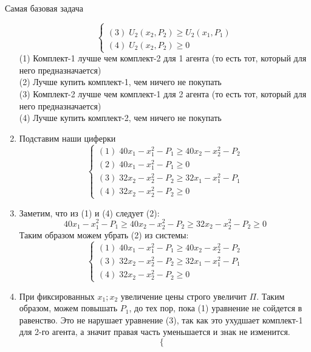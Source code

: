 \begin{mybox}{Самая базовая задача}
\begin{enumerate}
\begin{equation*}
\begin{cases}
           \\
           (3)\;U_2(x_2,P_2)\geq U_2(x_1,P_1)
           \\
           (4)\;U_2(x_2,P_2)\geq 0
         \end{cases}
        \end{equation*}
        (1) Комплект-1 лучше чем комплект-2 для 1 агента (то есть тот, который для него предназначается)\\
        (2) Лучше купить комплект-1, чем ничего не покупать\\
        (3) Комплект-2 лучше чем комплект-1 для 2 агента (то есть тот, который для него предназначается)\\
        (4) Лучше купить комплект-2, чем ничего не покупать
        \item Подставим наши циферки
        \begin{equation*}
         \begin{cases}
           (1)\;40x_1-x_1^2-P_1\geq 40x_2-x_2^2-P_2
           \\
           (2)\;40x_1-x_1^2-P_1\geq 0
           \\
           (3)\;32x_2-x_2^2-P_2\geq 32x_1-x_1^2-P_1
           \\
           (4)\;32x_2-x_2^2-P_2\geq 0
         \end{cases}
        \end{equation*}
        \item Заметим, что из (1) и (4) следует (2):
        $$40x_1-x_1^2-P_1\geq 40x_2-x_2^2-P_2\geq 32x_2-x_2^2-P_2\geq 0$$
        Таким образом можем убрать (2) из системы:
        \begin{equation*}
         \begin{cases}
           (1)\;40x_1-x_1^2-P_1\geq 40x_2-x_2^2-P_2
           \\
           (3)\;32x_2-x_2^2-P_2\geq 32x_1-x_1^2-P_1
           \\
           (4)\;32x_2-x_2^2-P_2\geq 0
         \end{cases}
        \end{equation*}
        \item При фиксированных $x_1;x_2$ увеличение цены строго увеличит $\Pi$. Таким образом, можем повышать $P_1$, до тех пор, пока (1) уравнение не сойдется в равенство. Это не нарушает уравнение (3), так как это ухудшает комплект-1 для 2-го агента, а значит правая часть уменьшается и знак не изменится.
        \begin{equation*}
         \begin{cases}

\end{cases}
\end{equation*}
\end{enumerate}
\end{mybox}
